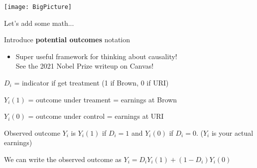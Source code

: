 \documentclass[11pt,english]{beamer}
\newenvironment{wideitemize}{\itemize\addtolength{\itemsep}{10pt}}{\enditemize}
\begin{document}
\begin{frame}
	\texttt{[image: BigPicture]}
\end{frame}


\begin{frame}{Let's add some math...}
\begin{wideitemize}
	\item Introduce \textbf{potential outcomes} notation
		\begin{itemize}
			\item 
			Super useful framework for thinking about causality! \\
			See the 2021 Nobel Prize writeup on Canvas!
		\end{itemize}
	
	\pause 
	\item $D_i$ = indicator if get treatment (1 if Brown, 0 if URI)
	
	\pause
	\item $Y_i(1)$ = outcome under treament = earnings at Brown
	\item $Y_i(0)$ = outcome under control = earnings at URI
	
	\pause 
	\item Observed outcome $Y_i$ is $Y_i(1)$ if $D_i = 1$ and $Y_i(0)$ if $D_i = 0$. ($Y_i$ is your actual earnings)
	
	\pause
	\item
	We can write the observed outcome as $Y_i = D_i Y_i(1) + (1-D_i) Y_i(0)$
\end{wideitemize}

\end{frame}
\end{document}
